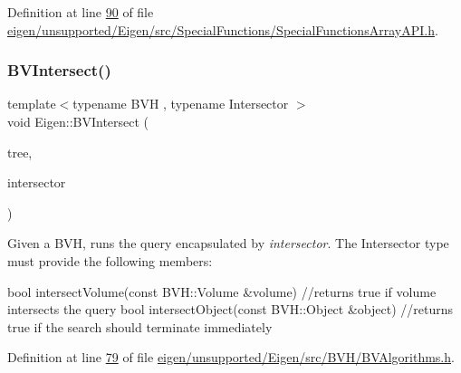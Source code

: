 Definition at line \hyperlink{eigen_2unsupported_2_eigen_2src_2_special_functions_2_special_functions_array_a_p_i_8h_source_l00090}{90} of file \hyperlink{eigen_2unsupported_2_eigen_2src_2_special_functions_2_special_functions_array_a_p_i_8h_source}{eigen/unsupported/\+Eigen/src/\+Special\+Functions/\+Special\+Functions\+Array\+A\+P\+I.\+h}.

\mbox{\label{namespace_eigen_a07d8e283f082c972338f3fc4f644b2a9}} 
\subsubsection{\texorpdfstring{B\+V\+Intersect()}{BVIntersect()}\hspace{0.1cm}{\footnotesize\ttfamily [1/2]}}
{\footnotesize\ttfamily template$<$typename B\+VH , typename Intersector $>$ \\
void Eigen\+::\+B\+V\+Intersect (\begin{DoxyParamCaption}\item[{const B\+VH \&}]{tree,  }\item[{Intersector \&}]{intersector }\end{DoxyParamCaption})}

Given a B\+VH, runs the query encapsulated by {\itshape intersector}. The Intersector type must provide the following members\+:
\begin{DoxyCode}
\textcolor{keywordtype}{bool} intersectVolume(\textcolor{keyword}{const} BVH::Volume &volume) \textcolor{comment}{//returns true if volume intersects the query}
\textcolor{keywordtype}{bool} intersectObject(\textcolor{keyword}{const} BVH::Object &\textcolor{keywordtype}{object}) \textcolor{comment}{//returns true if the search should terminate immediately}
\end{DoxyCode}
 

Definition at line \hyperlink{eigen_2unsupported_2_eigen_2src_2_b_v_h_2_b_v_algorithms_8h_source_l00079}{79} of file \hyperlink{eigen_2unsupported_2_eigen_2src_2_b_v_h_2_b_v_algorithms_8h_source}{eigen/unsupported/\+Eigen/src/\+B\+V\+H/\+B\+V\+Algorithms.\+h}.

\mbox{\label{namespace_eigen_ac3b8047a3ee05b5e6fec4668197a9a43}} 
